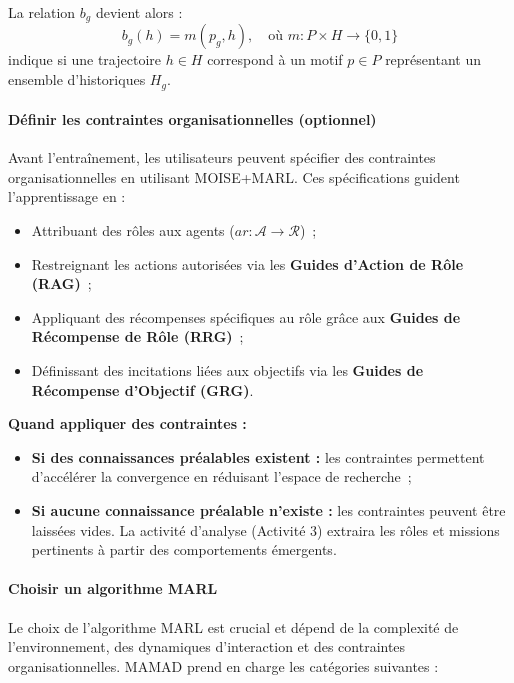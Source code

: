 La relation $b_g$ devient alors :
\[
    b_g(h) = m(p_g, h), \quad \text{où } m: P \times H \to \{0,1\}
\]
indique si une trajectoire $h \in H$ correspond à un motif $p \in P$ représentant un ensemble d'historiques $H_g$.

\paragraph{Définir les contraintes organisationnelles (optionnel)}

Avant l'entraînement, les utilisateurs peuvent spécifier des contraintes organisationnelles en utilisant MOISE+MARL. Ces spécifications guident l'apprentissage en :

\begin{itemize}
    \item Attribuant des rôles aux agents ($ar: \mathcal{A} \to \mathcal{R}$)~;
    \item Restreignant les actions autorisées via les \textbf{Guides d'Action de Rôle (RAG)}~;
    \item Appliquant des récompenses spécifiques au rôle grâce aux \textbf{Guides de Récompense de Rôle (RRG)}~;
    \item Définissant des incitations liées aux objectifs via les \textbf{Guides de Récompense d'Objectif (GRG)}.
\end{itemize}

\vspace{0.4em}
\noindent \textbf{Quand appliquer des contraintes :}
\begin{itemize}
    \item \textbf{Si des connaissances préalables existent :} les contraintes permettent d'accélérer la convergence en réduisant l'espace de recherche~;
    \item \textbf{Si aucune connaissance préalable n'existe :} les contraintes peuvent être laissées vides. La activité d'analyse (Activité 3) extraira les rôles et missions pertinents à partir des comportements émergents.
\end{itemize}

\paragraph{Choisir un algorithme MARL}

Le choix de l'algorithme MARL est crucial et dépend de la complexité de l'environnement, des dynamiques d'interaction et des contraintes organisationnelles. MAMAD prend en charge les catégories suivantes :

